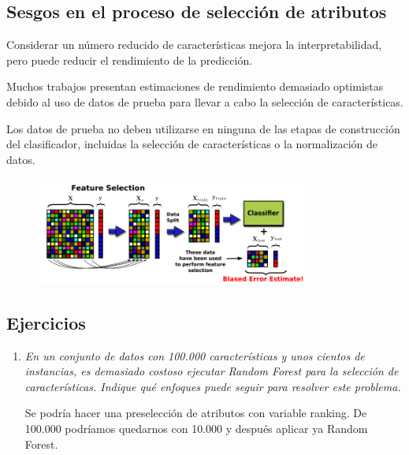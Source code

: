 \subsection{Sesgos en el proceso de selección de atributos}
Considerar un número reducido de características mejora la interpretabilidad, pero puede reducir el rendimiento de la predicción.

Muchos trabajos presentan estimaciones de rendimiento demasiado optimistas debido al uso de datos de prueba para llevar a cabo la selección de características.

Los datos de prueba no deben utilizarse en ninguna de las etapas de construcción del clasificador, incluidas la selección de características o la normalización de datos.

\begin{figure}[h]
\centering
\includegraphics[width = 0.8\textwidth]{figs/feature-selection-bias.png}
\end{figure}

\subsection{Ejercicios}
\begin{enumerate}
\item \textit{En un conjunto de datos con 100.000 características y unos cientos de instancias, es demasiado costoso ejecutar Random Forest para la selección de características. Indique qué enfoques puede seguir para resolver este problema.}

Se podría hacer una preselección de atributos con variable ranking. De 100.000 podríamos quedarnos con 10.000 y después aplicar ya Random Forest.
\end{enumerate}

